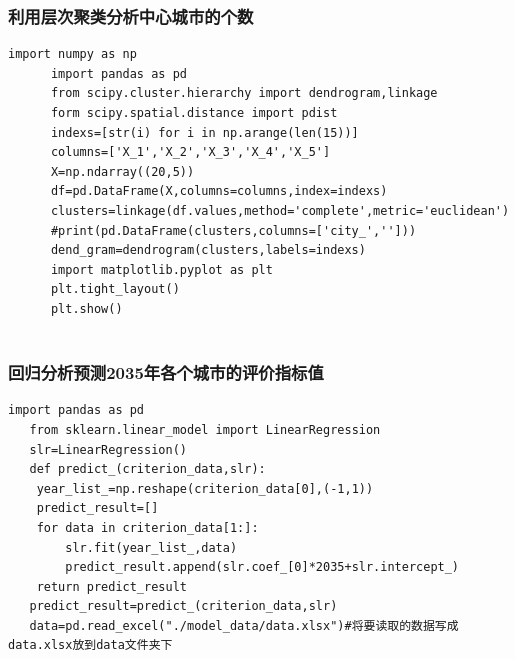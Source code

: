 \documentclass[openany,oneside]{ctexbook}
\begin{document}
\begin{appendix}
\begin{lstlisting}[firstnumber=1]
   \end{lstlisting}

   \subsubsection{利用层次聚类分析中心城市的个数}
   \begin{lstlisting}[firstnumber=1]
      import numpy as np
      import pandas as pd
      from scipy.cluster.hierarchy import dendrogram,linkage
      form scipy.spatial.distance import pdist
      indexs=[str(i) for i in np.arange(len(15))]
      columns=['X_1','X_2','X_3','X_4','X_5']
      X=np.ndarray((20,5))
      df=pd.DataFrame(X,columns=columns,index=indexs)
      clusters=linkage(df.values,method='complete',metric='euclidean')
      #print(pd.DataFrame(clusters,columns=['city_','']))
      dend_gram=dendrogram(clusters,labels=indexs)
      import matplotlib.pyplot as plt
      plt.tight_layout()
      plt.show()


   \end{lstlisting}

\end{appendix}
\subsubsection{回归分析预测2035年各个城市的评价指标值}
\begin{lstlisting}[firstnumber=1]
   import pandas as pd
   from sklearn.linear_model import LinearRegression
   slr=LinearRegression()
   def predict_(criterion_data,slr):
    year_list_=np.reshape(criterion_data[0],(-1,1))
    predict_result=[]
    for data in criterion_data[1:]:
        slr.fit(year_list_,data)
        predict_result.append(slr.coef_[0]*2035+slr.intercept_)
    return predict_result
   predict_result=predict_(criterion_data,slr)
   data=pd.read_excel("./model_data/data.xlsx")#将要读取的数据写成data.xlsx放到data文件夹下

   
\end{lstlisting}
\end{document}
